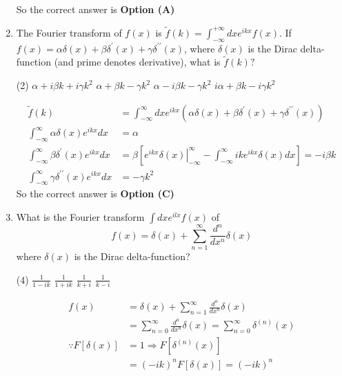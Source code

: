 \begin{enumerate}[label=\color{ocre}\textbf{\arabic*.}]
\begin{answer}
		So the correct answer is \textbf{Option (A)}
	\end{answer}
	\item  The Fourier transform of $f(x)$ is $\tilde{f}(k)=\int_{-\infty}^{+\infty} d x e^{i k x} f(x)$.
	If $f(x)=\alpha \delta(x)+\beta \delta^{\prime}(x)+\gamma \delta^{\prime \prime}(x)$, where $\delta(x)$ is the Dirac delta-function (and prime denotes derivative), what is $\tilde{f}(k) ?$
	{}
	\begin{tasks}(2)
		\task[\textbf{A.}] $\alpha+i \beta k+i \gamma k^{2}$
		\task[\textbf{B.}] $\alpha+\beta k-\gamma k^{2}$
		\task[\textbf{C.}]  $\alpha-i \beta k-\gamma k^{2}$
		\task[\textbf{D.}] $i \alpha+\beta k-i \gamma k^{2}$
	\end{tasks}
	\begin{answer}
		\begin{align*}
		\tilde{f}(k)&=\int_{-\infty}^{\infty} d x e^{i k x}\left(\alpha \delta(x)+\beta \delta^{\prime}(x)+\gamma \delta^{\prime \prime}(x)\right)\\
		\int_{-\infty}^{\infty} \alpha \delta(x) e^{i k x} d x&=\alpha\\
		\int_{-\infty}^{\infty} \beta \delta^{\prime}(x) e^{i k x} d x&=\beta\left[\left.e^{i k x} \delta(x)\right|_{-\infty} ^{\infty}-\int_{-\infty}^{\infty} i k e^{i k x} \delta(x) d x\right]=-i \beta k\\
		\int_{-\infty}^{\infty} \gamma \delta^{\prime \prime}(x) e^{i k x} d x&=-\gamma k^{2}
		\end{align*}
		So the correct answer is \textbf{Option (C)}
	\end{answer}
	\item  What is the Fourier transform $\int d x e^{i l x} f(x)$ of
	$$
	f(x)=\delta(x)+\sum_{n=1}^{\infty} \frac{d^{n}}{d x^{n}} \delta(x)
	$$
	where $\delta(x)$ is the Dirac delta-function?
	{}
	\begin{tasks}(4)
		\task[\textbf{A.}]  $\frac{1}{1-i k}$
		\task[\textbf{B.}] $\frac{1}{1+i k}$
		\task[\textbf{C.}] $\frac{1}{k+i}$
		\task[\textbf{D.}] $\frac{1}{k-i}$
	\end{tasks}
	\begin{answer}
		\begin{align*}
		f(x)&=\delta(x)+\sum_{n=1}^{\infty} \frac{d^{n}}{d x^{n}} \delta(x)\\&=\sum_{n=0}^{\infty} \frac{d^{n}}{d x^{n}} \delta(x)=\sum_{n=0}^{\infty} \delta^{(n)}(x)\\
		\because F[\delta(x)]&=1 \Rightarrow F\left[\delta^{(n)}(x)\right]\\&=(-i k)^{n} F[\delta(x)]=(-i k)^{n}\\

\end{align*}
\end{answer}
\end{enumerate}
